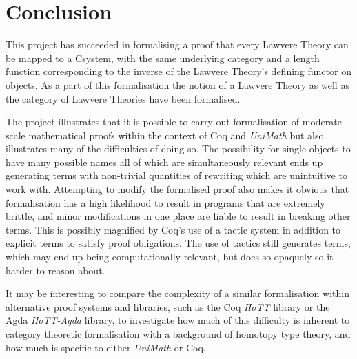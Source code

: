 \chapter{Conclusion}
This project has succeeded in formalising a proof that every Lawvere Theory can
be mapped to a Csystem, with the same underlying category and a length function
corresponding to the inverse of the Lawvere Theory's defining functor on
objects. As a part of this formalisation the notion of a Lawvere Theory as well
as the category of Lawvere Theories have been formalised.

The project illustrates that it is possible to carry out formalisation of
moderate scale mathematical proofs within the context of Coq and
\textit{UniMath} but also illustrates many of the difficulties of doing so. The
possibility for single objects to have many possible names all of which are
simultaneously relevant ends up generating terms with non-trivial quantities of
rewriting which are unintuitive to work with. Attempting to modify the
formalised proof also makes it obvious that formalisation has a high likelihood
to result in programs that are extremely brittle, and minor modifications in one
place are liable to result in breaking other terms. This is possibly magnified
by Coq's use of a tactic system in addition to explicit terms to satisfy proof
obligations. The use of tactics still generates terms, which may end up being
computationally relevant, but does so opaquely so it harder to reason about.

It may be interesting to compare the complexity of a similar formalisation
within alternative proof systems and libraries, such as the Coq \textit{HoTT}
library or the Agda \textit{HoTT-Agda} library, to investigate how much of this
difficulty is inherent to category theoretic formalisation with a background of
homotopy type theory, and how much is specific to either \textit{UniMath} or
Coq.